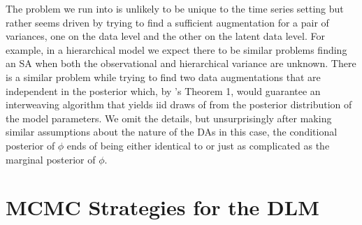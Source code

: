 \documentclass{article}
\begin{document}
The problem we run into is unlikely to be unique to the time series setting but rather seems driven by trying to find a sufficient augmentation for a pair of variances, one on the data level and the other on the latent data level. For example, in a hierarchical model we expect there to be similar problems finding an SA when both the observational and hierarchical variance are unknown. There is a similar problem while trying to find two data augmentations that are independent in the posterior which, by 's Theorem 1, would guarantee an interweaving algorithm that yields iid draws of from the posterior distribution of the model parameters. We omit the details, but unsurprisingly after making similar assumptions about the nature of the DAs in this case, the conditional posterior of $\phi$ ends of being either identical to or just as complicated as the marginal posterior of $\phi$.

\section{MCMC Strategies for the DLM}\label{sec:Algs}
\end{document}
